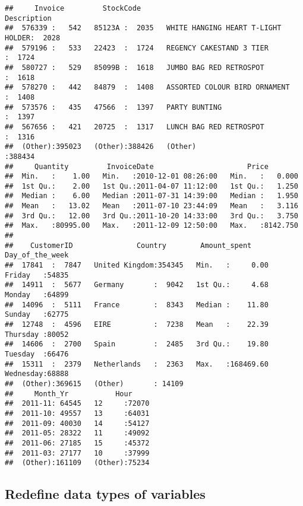 \documentclass[
]{article}
\begin{document}
\begin{verbatim}
##     Invoice         StockCode                                  Description    
##  576339 :   542   85123A :  2035   WHITE HANGING HEART T-LIGHT HOLDER:  2028  
##  579196 :   533   22423  :  1724   REGENCY CAKESTAND 3 TIER          :  1724  
##  580727 :   529   85099B :  1618   JUMBO BAG RED RETROSPOT           :  1618  
##  578270 :   442   84879  :  1408   ASSORTED COLOUR BIRD ORNAMENT     :  1408  
##  573576 :   435   47566  :  1397   PARTY BUNTING                     :  1397  
##  567656 :   421   20725  :  1317   LUNCH BAG RED RETROSPOT           :  1316  
##  (Other):395023   (Other):388426   (Other)                           :388434  
##     Quantity         InvoiceDate                      Price         
##  Min.   :    1.00   Min.   :2010-12-01 08:26:00   Min.   :   0.000  
##  1st Qu.:    2.00   1st Qu.:2011-04-07 11:12:00   1st Qu.:   1.250  
##  Median :    6.00   Median :2011-07-31 14:39:00   Median :   1.950  
##  Mean   :   13.02   Mean   :2011-07-10 23:44:09   Mean   :   3.116  
##  3rd Qu.:   12.00   3rd Qu.:2011-10-20 14:33:00   3rd Qu.:   3.750  
##  Max.   :80995.00   Max.   :2011-12-09 12:50:00   Max.   :8142.750  
##                                                                     
##    CustomerID               Country        Amount_spent        Day_of_the_week 
##  17841  :  7847   United Kingdom:354345   Min.   :     0.00   Friday   :54835  
##  14911  :  5677   Germany       :  9042   1st Qu.:     4.68   Monday   :64899  
##  14096  :  5111   France        :  8343   Median :    11.80   Sunday   :62775  
##  12748  :  4596   EIRE          :  7238   Mean   :    22.39   Thursday :80052  
##  14606  :  2700   Spain         :  2485   3rd Qu.:    19.80   Tuesday  :66476  
##  15311  :  2379   Netherlands   :  2363   Max.   :168469.60   Wednesday:68888  
##  (Other):369615   (Other)       : 14109                                        
##     Month_Yr           Hour      
##  2011-11: 64545   12     :72070  
##  2011-10: 49557   13     :64031  
##  2011-09: 40030   14     :54127  
##  2011-05: 28322   11     :49092  
##  2011-06: 27185   15     :45372  
##  2011-03: 27177   10     :37999  
##  (Other):161109   (Other):75234
\end{verbatim}

\hypertarget{redefine-data-types-of-variables-1}{%
\subsection{Redefine data types of
variables}\label{redefine-data-types-of-variables-1}}
\end{document}
